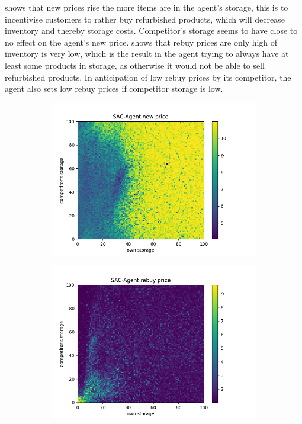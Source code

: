  shows that new prices rise the more items are in the agent's storage, this is to incentivise customers to rather buy refurbished products, which will decrease inventory and thereby storage costs. Competitor's storage seems to have close to no effect on the agent's new price.  shows that rebuy prices are only high of inventory is very low, which is the result in the agent trying to always have at least some products in storage, as otherwise it would not be able to sell refurbished products. In anticipation of low rebuy prices by its competitor, the agent also sets low rebuy prices if competitor storage is low.

\begin{figure}[ht]
	\centering
	\begin{subfigure}[t]{0.49\textwidth}
		\centering
		\includegraphics[width = \textwidth]{images/experiments/SACDuopoly/policyanalyzer/Appendix/both_storage/new_price.png}\\
		\label{fig:AppendixSACDuopolyPolicyanalyser2new}
	\end{subfigure}
	\begin{subfigure}[t]{0.49\textwidth}
		\centering
		\includegraphics[width = \textwidth]{images/experiments/SACDuopoly/policyanalyzer/Appendix/both_storage/rebuy_price.png}\\

\end{subfigure}
\end{figure}
